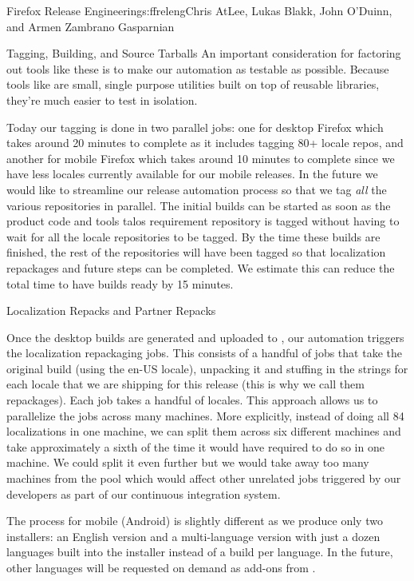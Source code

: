 \begin{aosachapter}{Firefox Release Engineering}{s:ffreleng}{Chris AtLee, Lukas Blakk, John O'Duinn, and Armen Zambrano Gasparnian}
\begin{aosasect1}{Tagging, Building, and Source Tarballs}
An important consideration for factoring out tools like these is to
make our automation as testable as possible. Because tools like
 are small, single purpose utilities built on top of
reusable libraries, they're much easier to test in isolation.

Today our tagging is done in two parallel jobs: one for desktop
Firefox which takes around 20 minutes to complete as it includes
tagging 80+ locale repos, and another for mobile Firefox which takes
around 10 minutes to complete since we have less locales currently
available for our mobile releases. In the future we would like to
streamline our release automation process so that we tag \emph{all}
the various repositories in parallel. The initial builds can be
started as soon as the product code and tools talos requirement
repository is tagged without having to wait for all the locale
repositories to be tagged. By the time these builds are finished, the
rest of the repositories will have been tagged so that localization
repackages and future steps can be completed.  We estimate this can
reduce the total time to have builds ready by 15 minutes.

\end{aosasect1}

\begin{aosasect1}{Localization Repacks and Partner Repacks}


Once the desktop builds are generated and uploaded to
, our automation triggers the localization
repackaging jobs. This consists of a handful of jobs that take the
original build (using the en-US locale), unpacking it and stuffing in
the strings for each locale that we are shipping for this release
(this is why we call them repackages). Each job takes a handful of
locales. This approach allows us to parallelize the jobs across many
machines. More explicitly, instead of doing all 84 localizations in
one machine, we can split them across six different machines and take
approximately a sixth of the time it would have required to do so in
one machine. We could split it even further but we would take away too
many machines from the pool which would affect other unrelated jobs
triggered by our developers as part of our continuous integration
system.
    
The process for mobile (Android) is slightly different as we produce
only two installers: an English version and a multi-language version
with just a dozen languages built into the installer instead of a
build per language. In the future, other languages will be requested
on demand as add-ons from .


\end{aosasect1}
\end{aosachapter}
